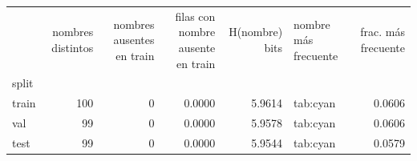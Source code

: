 \begin{tabular}{lrrrrlr}
\toprule
 & nombres distintos & nombres ausentes en train & filas con nombre ausente en train & H(nombre) bits & nombre más frecuente & frac. más frecuente \\
split &  &  &  &  &  &  \\
\midrule
train & 100 & 0 & 0.0000 & 5.9614 & tab:cyan & 0.0606 \\
val & 99 & 0 & 0.0000 & 5.9578 & tab:cyan & 0.0606 \\
test & 99 & 0 & 0.0000 & 5.9544 & tab:cyan & 0.0579 \\
\bottomrule
\end{tabular}

